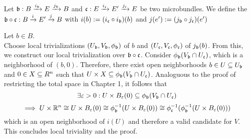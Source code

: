  \\
Let $\bundledef{\bb}{B}{E}{i_\bb}{j_\bb}$ and $\bundledef{\bc}{E}{E'}{i_\bc}{j_\bc}$ be two microbundles.
We define the  $\bundledef{\bb \circ \bc}{B}{E'}{i}{j}$ with
$i(b) := (i_\bc \circ i_\bb)(b)$ and $j(e') := (j_\bb \circ j_\bc)(e')$
\begin{myproof}
Let $b \in B$. \\
Choose local trivializations $(U_\bb, V_\bb, \phi_\bb)$ of $b$ and $(U_\bc, V_\bc, \phi_\bc)$ of $j_\bb(b)$.
From this, we construct our local trivialization over $\bb \circ \bc$.
Consider $\phi_\bb(V_\bb \cap U_\bc)$, which is a neighborhood of $(b, 0)$.
Therefore, there exist open neighborhoods $b \in U \sub U_\bb$ and $0 \in X \sub R^n$ such that $U \times X \sub \phi_\bb(V_\bb \cap U_\bc)$.
Analoguous to the proof of restricting the total space in Chapter 1, it follows that
\[ \exists \varepsilon > 0: U \times B_\varepsilon(0) \sub \phi_\bb(V_\bb \cap U_\bc) \]
\[ \implies U \times \R^n \cong U \times B_\varepsilon(0) \cong \phi_\bb^{-1}(U \times B_\varepsilon(0)) \cong \phi_\bc^{-1}(\phi_\bb^{-1}(U \times B_\varepsilon(0))) \]
which is an open neighborhood of $i(U)$ and therefore a valid candidate for $V$.
This concludes local triviality and the proof.
\end{myproof}